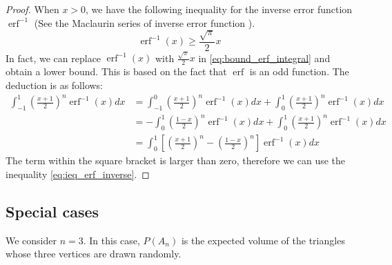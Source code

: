 \documentclass{article}
\DeclareMathOperator{\erf}{erf}
\begin{document}
\begin{proof}
    When $x>0$, we have the following inequality
    for the inverse error function $\erf^{-1}$
    (See the Maclaurin series of inverse error function
    \cite{inverseErf}).
    \begin{equation}\label{eq:ieq_erf_inverse}
        \erf^{-1}(x) \geq \frac{\sqrt{\pi}}{2}x
    \end{equation}
    In fact, we can replace
    $\erf^{-1}(x)$
    with $\frac{\sqrt{\pi}}{2}x$
    in \eqref{eq:bound_erf_integral} and obtain
    a lower bound.  This is based on the fact
    that $\erf$ is an odd function.
    The deduction is as follows:
    \begin{align*}  
        \int_{-1}^{1}
    \left(\frac{x+1}{2} \right)^n
    \erf^{-1} (x)dx
    &= \int_{-1}^{0}
    \left(\frac{x+1}{2} \right)^n
    \erf^{-1} (x)dx
    +\int_{0}^{1}
    \left(\frac{x+1}{2} \right)^n
    \erf^{-1} (x)dx \\
    &=-\int_{0}^{1}
    \left(\frac{1-x}{2} \right)^n
    \erf^{-1} (x)dx
    +\int_{0}^{1}
    \left(\frac{x+1}{2} \right)^n
    \erf^{-1} (x)dx \\
    &=    
    \int_{0}^{1}
    \left[\left(\frac{x+1}{2} \right)^n-
    \left(\frac{1-x}{2} \right)^n\right]
    \erf^{-1} (x)dx
    \end{align*}
    The term within the square bracket is larger
    than zero, therefore we can use
    the inequality \eqref{eq:ieq_erf_inverse}.

\end{proof}

\subsection{Special cases}
We consider $n=3$.
In this case, $P(A_n)$
is the expected volume of the triangles
whose three vertices are drawn randomly.
\end{document}
